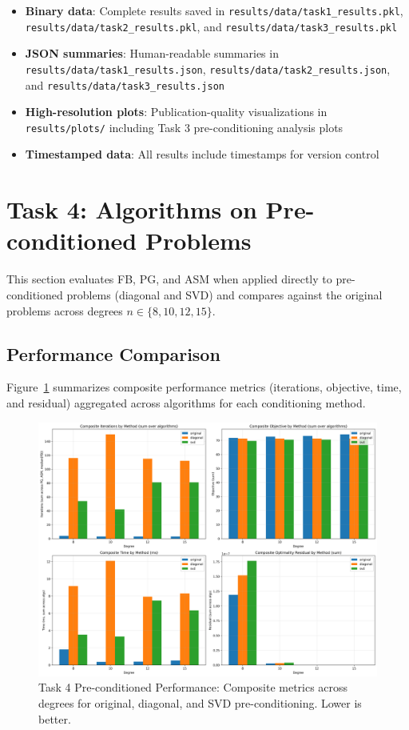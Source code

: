 \documentclass[11pt,a4paper]{article}
\begin{document}
\begin{itemize}
    \item \textbf{Binary data}: Complete results saved in \texttt{results/data/task1\_results.pkl}, \texttt{results/data/task2\_results.pkl}, and \texttt{results/data/task3\_results.pkl}
    \item \textbf{JSON summaries}: Human-readable summaries in \texttt{results/data/task1\_results.json}, \texttt{results/data/task2\_results.json}, and \texttt{results/data/task3\_results.json}
    \item \textbf{High-resolution plots}: Publication-quality visualizations in \texttt{results/plots/} including Task 3 pre-conditioning analysis plots
    \item \textbf{Timestamped data}: All results include timestamps for version control
\end{itemize}

\section{Task 4: Algorithms on Pre-conditioned Problems}

This section evaluates FB, PG, and ASM when applied directly to pre-conditioned problems (diagonal and SVD) and compares against the original problems across degrees $n \in \{8,10,12,15\}$.

\subsection{Performance Comparison}

Figure~\ref{fig:task4_perf} summarizes composite performance metrics (iterations, objective, time, and residual) aggregated across algorithms for each conditioning method.

\begin{figure}[h]
\centering
\includegraphics[width=\textwidth]{../results/plots/task4_preconditioned_performance.png}
\caption{Task 4 Pre-conditioned Performance: Composite metrics across degrees for original, diagonal, and SVD pre-conditioning. Lower is better.}
\label{fig:task4_perf}
\end{figure}
\end{document}
